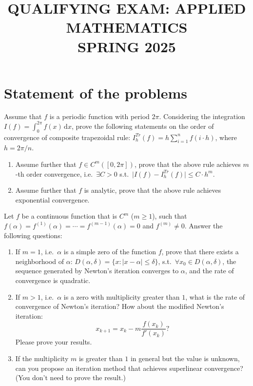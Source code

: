 \documentclass[11pt,a4paper]{article}
\title{\textbf{QUALIFYING EXAM: APPLIED MATHEMATICS}\\[0.5em]\Large SPRING 2025}
\date{}
\author{}
\newcommand{\examstatement}[1]{%
  \par\addvspace{0.85em}%
  \noindent{\bfseries #1}\par\nobreak\addvspace{0.28em}%
}
\begin{document}
\maketitle
\vspace{-3em}

\tableofcontents

\section{Statement of the problems}

\examstatement{Problem 1. [15 points]}
Assume that \(f\) is a periodic function with period \(2\pi\). Considering the integration \(I(f) = \int_{0}^{2\pi} f(x)\,\mathrm{d}x\), prove the following statements on the order of convergence of composite trapezoidal rule: \(I_{h}^{Tr}(f) = h \sum_{i=1}^{n} f(i \cdot h)\), where \(h = 2\pi/n\).
\begin{enumerate}[label=(\roman*)]
    \item Assume further that \(f \in C^{m}([0, 2\pi])\), prove that the above rule achieves \(m\)-th order convergence, i.e.\ \(\exists C > 0\) s.t.\ \(\lvert I(f) - I_{h}^{Tr}(f)\rvert \le C \cdot h^{m}\).
    \item Assume further that \(f\) is analytic, prove that the above rule achieves exponential convergence.
\end{enumerate}

\examstatement{Problem 2. [15 points]}
Let \(f\) be a continuous function that is \(C^{m}\) (\(m \ge 1\)), such that \(f(\alpha) = f^{(1)}(\alpha) = \cdots = f^{(m-1)}(\alpha) = 0\) and \(f^{(m)} \neq 0\). Answer the following questions:
\begin{enumerate}[label=(\roman*)]
    \item If \(m = 1\), i.e.\ \(\alpha\) is a simple zero of the function \(f\), prove that there exists a neighborhood of \(\alpha\): \(D(\alpha, \delta) = \{x : |x - \alpha| \le \delta\}\), s.t.\ \(\forall x_{0} \in D(\alpha, \delta)\), the sequence generated by Newton's iteration converges to \(\alpha\), and the rate of convergence is quadratic.
    \item If \(m > 1\), i.e.\ \(\alpha\) is a zero with multiplicity greater than \(1\), what is the rate of convergence of Newton's iteration? How about the modified Newton's iteration:
    \[
    x_{k+1} = x_{k} - m \frac{f(x_{k})}{f'(x_{k})}?
    \]
    Please prove your results.
    \item If the multiplicity \(m\) is greater than \(1\) in general but the value is unknown, can you propose an iteration method that achieves superlinear convergence? (You don't need to prove the result.)
\end{enumerate}
\end{document}
